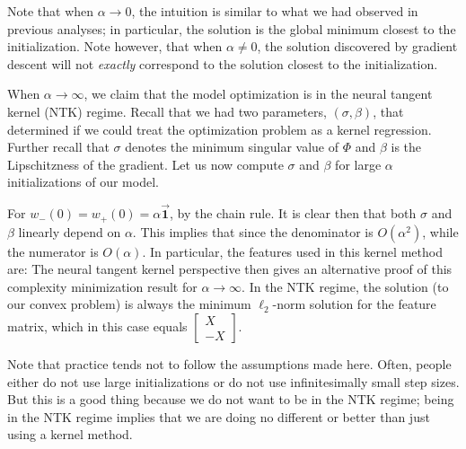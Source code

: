 \begin{remark}
Note that when $\alpha \to 0$, the intuition is similar to what we had observed in previous analyses; in particular, the solution is the global minimum closest to the initialization.  Note however, that when $\alpha \neq 0$, the solution discovered by gradient descent will not \textit{exactly} correspond to the solution closest to the initialization.
\end{remark}

\begin{remark}
When $\alpha \to \infty$, we claim that the model optimization is in the neural tangent kernel (NTK) regime.  Recall that we had two parameters, $(\sigma, \beta)$, that determined if we could treat the optimization problem as a kernel regression. Further recall that $\sigma$ denotes the minimum singular value of $\Phi$ and $\beta$ is the Lipschitzness of the gradient. Let us now compute $\sigma$ and $\beta$ for large $\alpha$ initializations of our model.

For $w_-(0) = w_+(0) = \alpha \vec{\mathbf{1}}$,
by the chain rule.  It is clear then that both $\sigma$ and $\beta$ linearly depend on $\alpha$.  This implies that
since the denominator is $O(\alpha^2)$, while the numerator is $O(\alpha)$.  In particular, the features used in this kernel method are:
The neural tangent kernel perspective then gives an alternative proof of this complexity minimization result for $\alpha \to \infty$. In the NTK regime, the solution (to our convex problem) is always the minimum $\ell_2$-norm solution for the feature matrix, which in this case equals $\begin{bmatrix} X \\ - X \end{bmatrix}$. 

Note that practice tends not to follow the assumptions made here. Often, people either do not use large initializations or do not use infinitesimally small step sizes. But this is a good thing  because we do not want to be in the NTK regime; being in the NTK regime implies that we are doing no different or better than just using a kernel method.
\end{remark}

